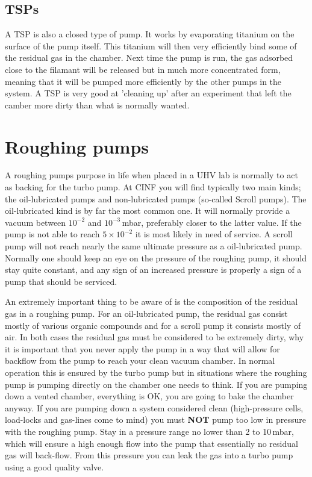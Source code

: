 \documentclass[a4paper,english]{article}
\begin{document}
\subsection{TSPs}
A TSP is also a closed type of pump. It works by evaporating titanium on the surface of the pump itself. This titanium will then very efficiently bind some of the residual gas in the chamber. Next time the pump is run, the gas adsorbed close to the filamant will be released but in much more concentrated form, meaning that it will be pumped more efficiently by the other pumps in the system. A TSP is very good at 'cleaning up' after an experiment that left the camber more dirty than what is normally wanted.

\section{Roughing pumps}
A roughing pumps purpose in life when placed in a UHV lab is normally to act as backing for the turbo pump. At CINF you will find typically two main kinds; the oil-lubricated pumps and non-lubricated pumps (so-called Scroll pumps). The oil-lubricated kind is by far the most common one. It will normally provide a vacuum between $10^{-2}$ and $10^{-3}$\,mbar, preferably closer to the latter value. If the pump is not able to reach $5\times10^{-2}$ it is most likely in need of service. A scroll pump will not reach nearly the same ultimate pressure as a oil-lubricated pump. Normally one should keep an eye on the pressure of the roughing pump, it should stay quite constant, and any sign of an increased pressure is properly a sign of a pump that should be serviced.

An extremely important thing to be aware of is the composition of the residual gas in a roughing pump. For an oil-lubricated pump, the residual gas consist mostly of various organic compounds and for a scroll pump it consists mostly of air. In both cases the residual gas must be considered to be extremely dirty, why it is important that you never apply the pump in a way that will allow for backflow from the pump to reach your clean vacuum chamber. In normal operation this is ensured by the turbo pump but in situations where the roughing pump is pumping directly on the chamber one needs to think. If you are pumping down a vented chamber, everything is OK, you are going to bake the chamber anyway. If you are pumping down a system considered clean (high-pressure cells, load-locks and gas-lines come to mind) you must \textbf{NOT} pump too low in pressure with the roughing pump. Stay in a pressure range no lower than 2 to 10\,mbar, which will ensure a high enough flow into the pump that essentially no residual gas will back-flow. From this pressure you can leak the gas into a turbo pump using a good quality valve.
\end{document}
